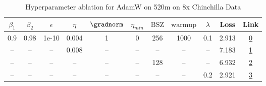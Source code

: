 \begin{table}[H]
\centering
\caption{Hyperparameter ablation for AdamW on 520m on 8x Chinchilla Data}
\label{tab:ablation_adamw_520m_on_8x_chinchilla_data}
\begin{tabular}{ccccccccccc}
\toprule
$\beta_1$ & $\beta_2$ & $\epsilon$ & $\eta$ & $\gradnorm$ & $\eta_{min}$ & $\mathrm{BSZ}$ & $\mathrm{warmup}$ & $\lambda$ & Loss & Link \\
\midrule
0.9 & 0.98 & 1e-10 & 0.004 & 1 & 0 & 256 & 1000 & 0.1 & 2.913 & \href{https://wandb.ai/stanford-mercury/optimizer-scaling/runs/sweep-520m-85B-adamwf14f39lr0.004-wd0.1-minlr0-warmup1000-b10.9--84afa9}{0} \\
\midrule
-- & -- & -- & 0.008 & -- & -- & -- & -- & -- & 7.183 & \href{https://wandb.ai/stanford-mercury/optimizer-scaling/runs/sweep-520m-85B-adamw166f50lr0.008-wd0.1-minlr0-warmup1000-b10.9--397bf5}{1} \\
-- & -- & -- & -- & -- & -- & 128 & -- & -- & 6.932 & \href{https://wandb.ai/stanford-mercury/optimizer-scaling/runs/sweep-520m-85B-adamw2b7ec2lr0.004-wd0.1-minlr0-warmup1000-b10.9--01c1ad}{2} \\
-- & -- & -- & -- & -- & -- & -- & -- & 0.2 & 2.921 & \href{https://wandb.ai/stanford-mercury/optimizer-scaling/runs/sweep-520m-85B-adamw61633blr0.004-wd0.2-minlr0-warmup1000-b10.9--1a26e3}{3} \\
\bottomrule
\end{tabular}
\end{table}

